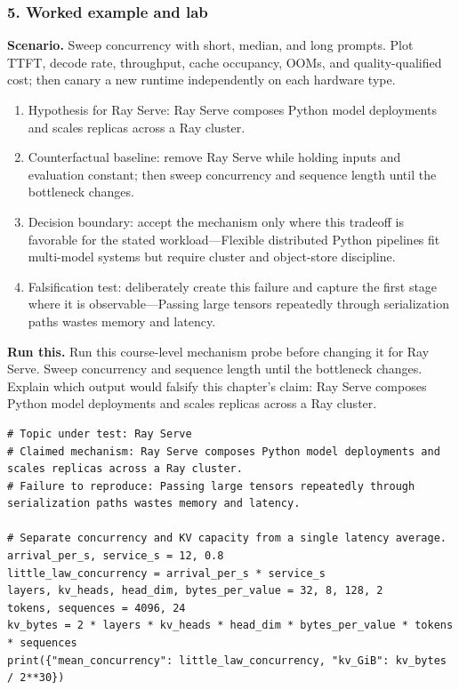 \subsubsection*{5. Worked example and lab}
\textbf{Scenario.} Sweep concurrency with short, median, and long prompts. Plot TTFT, decode rate, throughput, cache occupancy, OOMs, and quality-qualified cost; then canary a new runtime independently on each hardware type.
\begin{enumerate}
\item Hypothesis for Ray Serve: Ray Serve composes Python model deployments and scales replicas across a Ray cluster.
\item Counterfactual baseline: remove Ray Serve while holding inputs and evaluation constant; then sweep concurrency and sequence length until the bottleneck changes.
\item Decision boundary: accept the mechanism only where this tradeoff is favorable for the stated workload—Flexible distributed Python pipelines fit multi-model systems but require cluster and object-store discipline.
\item Falsification test: deliberately create this failure and capture the first stage where it is observable—Passing large tensors repeatedly through serialization paths wastes memory and latency.
\end{enumerate}
\textbf{Run this.} Run this course-level mechanism probe before changing it for Ray Serve. Sweep concurrency and sequence length until the bottleneck changes. Explain which output would falsify this chapter's claim: Ray Serve composes Python model deployments and scales replicas across a Ray cluster.
\begin{Verbatim}[fontsize=\scriptsize]
# Topic under test: Ray Serve
# Claimed mechanism: Ray Serve composes Python model deployments and scales replicas across a Ray cluster.
# Failure to reproduce: Passing large tensors repeatedly through serialization paths wastes memory and latency.

# Separate concurrency and KV capacity from a single latency average.
arrival_per_s, service_s = 12, 0.8
little_law_concurrency = arrival_per_s * service_s
layers, kv_heads, head_dim, bytes_per_value = 32, 8, 128, 2
tokens, sequences = 4096, 24
kv_bytes = 2 * layers * kv_heads * head_dim * bytes_per_value * tokens * sequences
print({"mean_concurrency": little_law_concurrency, "kv_GiB": kv_bytes / 2**30})
\end{Verbatim}
